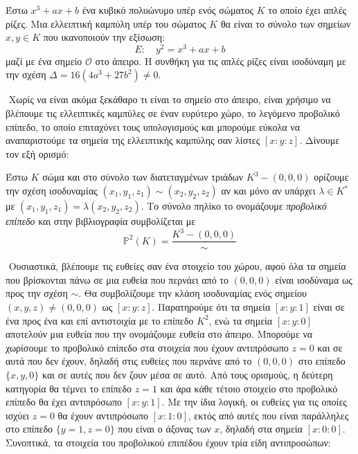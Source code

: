 \documentclass[oneside,a4paper]{article}
\begin{document}
\vspace*{0.1cm}
\begin{defn}
	Έστω $x^3 +ax + b$ ένα κυβικό πολυώνυμο υπέρ ενός σώματος $K$ το οποίο έχει απλές ρίζες. Μια ελλειπτική καμπύλη υπέρ του σώματος $K$ θα είναι το σύνολο των σημείων $x,y \in K$ που ικανοποιούν την εξίσωση:
	$$E: \quad y^2 = x^3 + ax + b$$ μαζί με ένα σημείο $\mathcal{O}$ στο άπειρο. Η συνθήκη για τις απλές ρίζες είναι ισοδύναμη με την σχέση $\Delta = 16(4a^3 +27b^2)\neq 0$.
\end{defn}

$ $\newline
Χωρίς να είναι ακόμα ξεκάθαρο τι είναι το σημείο στο άπειρο, είναι χρήσιμο να βλέπουμε τις ελλειπτικές καμπύλες σε έναν ευρύτερο χώρο, το λεγόμενο προβολικό επίπεδο, το οποίο επιταχύνει τους υπολογισμούς και μπορούμε εύκολα να αναπαριστούμε τα σημεία της ελλειπτικής καμπύλης σαν λίστες $[x:y:z]$. Δίνουμε τον εξή ορισμό:

\vspace*{0.1cm}
\begin{defn}
	Έστω $K$ σώμα και στο σύνολο των διατεταγμένων τριάδων $K^3 - (0,0,0)$ ορίζουμε την σχέση ισοδυναμίας $(x_1,y_1,z_1) \sim (x_2,y_2,z_2)$ αν και μόνο αν υπάρχει $\lambda \in K^*$ με $(x_1,y_1,z_1) = \lambda (x_2,y_2,z_2)$. Το σύνολο πηλίκο το ονομάζουμε {\em προβολικό επίπεδο} και στην βιβλιογραφία συμβολίζεται με
	$$\mathbb{P}^2(K) = \frac{K^3 - (0,0,0)}{\sim }$$
\end{defn}

$ $\newline
Ουσιαστικά, βλέπουμε τις ευθείες σαν ένα στοιχείο του χώρου, αφού όλα τα σημεία που βρίσκονται πάνω σε μια ευθεία που περνάει από το $(0,0,0)$ είναι ισοδύναμα ως προς την σχέση $\sim$. Θα συμβολίζουμε την κλάση ισοδυναμίας ενός σημείου $(x,y,z)\neq (0,0,0)$ ως $[x:y:z]$. Παρατηρούμε ότι τα σημεία $[x:y:1]$ είναι σε ένα προς ένα και επί αντιστοιχία με το επίπεδο $K^2$, ενώ τα σημεία $[x:y:0]$ αποτελούν μια ευθεία που την ονομάζουμε ευθεία στο άπειρο. Μπορούμε να χωρίσουμε το προβολικό επίπεδο στα στοιχεία που έχουν αντιπρόσωπο $z=0$ και σε αυτά που δεν έχουν, δηλαδή στις ευθείες που περνάνε από το $(0,0,0)$ στο επίπεδο $\{x,y,0\}$ και σε αυτές που δεν ζουν μέσα σε αυτό. Από τους ορισμούς, η δεύτερη κατηγορία θα τέμνει το επίπεδο $z=1$ και άρα κάθε τέτοιο στοιχείο στο προβολικό επίπεδο θα έχει αντιπρόσωπο $[x:y:1]$. Με την ίδια λογική, οι ευθείες για τις οποίες ισχύει $z=0$ θα έχουν αντιπρόσωπο $[x:1:0]$, εκτός από αυτές που είναι παράλληλες στο επίπεδο $\{y=1,z=0\}$ που είναι ο άξονας των $x$, δηλαδή στα σημεία $[x:0:0]$. Συνοπτικά, τα στοιχεία του προβολικού επιπέδου έχουν τρία είδη αντιπροσώπων:
\end{document}
